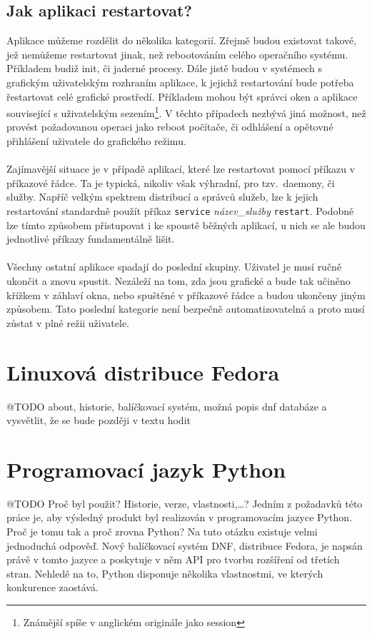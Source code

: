 \documentclass[10pt,a4paper]{article}
\begin{document}
		\subsection{Jak aplikaci restartovat?}
		Aplikace můžeme rozdělit do několika kategorií. Zřejmě budou existovat takové, jež nemůžeme restartovat jinak, než rebootováním celého operačního systému. Příkladem budiž init, či jaderné procesy. Dále jistě budou v systémech s grafickým uživatelským rozhraním aplikace, k jejichž restartování bude potřeba řestartovat celé grafické prostředí. Příkladem mohou být správci oken a aplikace související s uživatelským sezením\footnote{Známější spíše v anglickém originále jako session}. V těchto případech nezbývá jiná možnost, než provést požadovanou operaci jako reboot počítače, či odhlášení a opětovné přihlášení uživatele do grafického režimu.
		\\
		\\
		Zajímavější situace je v případě aplikací, které lze restartovat pomocí příkazu v příkazové řádce. Ta je typická, nikoliv však výhradní, pro tzv.\ daemony, či služby. Napříč velkým spektrem distribucí a správců služeb, lze k jejich restartování standardně použít příkaz \texttt{service} \textit{název\_služby} \texttt{restart}. Podobně lze tímto způsobem přistupovat i ke spoustě běžných aplikací, u nich se ale budou jednotlivé příkazy fundamentálně lišit.
		\\
		\\
		Všechny ostatní aplikace spadají do poslední skupiny. Uživatel je musí ručně ukončit a znovu spustit. Nezáleží na tom, zda jsou grafické a bude tak učiněno křížkem v záhlaví okna, nebo spuštěné v příkazové řádce a budou ukončeny jiným způsobem. Tato poslední kategorie není bezpečně automatizovatelná a proto musí zůstat v plné režii uživatele.

	\newpage
	\section{Linuxová distribuce Fedora}
	@TODO about, historie, balíčkovací systém, možná popis dnf databáze a vysvětlit, že se bude později v textu hodit

	\newpage
	\section{Programovací jazyk Python}
	@TODO Proč byl použit? Historie, verze, vlastnosti,\dots?
	Jedním z požadavků této práce je, aby výsledný produkt byl realizován v programovacím jazyce Python. Proč je tomu tak a proč zrovna Python? Na tuto otázku existuje velmi jednoduchá odpověď. Nový balíčkovací systém DNF, distribuce Fedora, je napsán právě v tomto jazyce a poskytuje v něm API pro tvorbu rozšíření od třetích stran. Nehledě na to, Python disponuje několika vlastnostmi, ve kterých konkurence zaostává.
\end{document}

